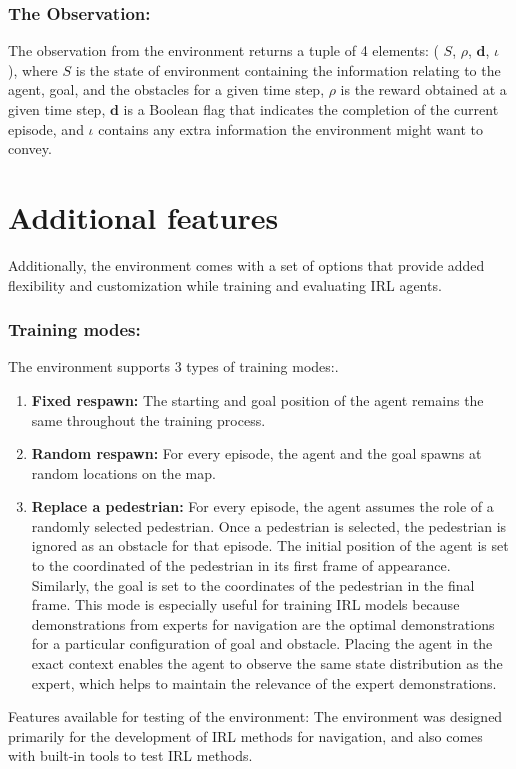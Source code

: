 \subsubsection{The Observation:}
The observation from the environment returns a tuple of 4 elements: ( $S$, $\rho$, $\mathbf{d}$, $\iota$ ), where
$S$ is the state of environment containing the information relating to the agent, goal, and the obstacles for a given time step,
$\rho$ is the reward obtained at a given time step, $\mathbf{d}$ is a Boolean flag that indicates the completion of the current episode, and $\iota$ contains any extra information the environment might want to convey.
\section{Additional features}
Additionally, the environment comes with a set of options that provide added flexibility and customization while training and evaluating IRL agents.
\subsubsection{Training modes:}
The environment supports 3 types of training modes:. 
\begin{enumerate}
    \item \textbf{Fixed respawn:} The starting and goal position of the agent remains the same throughout the training process.
    \item \textbf{Random respawn:} For every episode, the agent and the goal spawns at random locations on the map. 
    \item \textbf{Replace a pedestrian:} For every episode, the agent assumes the role of a randomly selected pedestrian. Once a pedestrian is selected, the pedestrian is ignored as an obstacle for that episode. The initial position of the agent is set to the coordinated of the pedestrian in its first frame of appearance. Similarly, the goal is set to the coordinates of the pedestrian in the final frame.
    This mode is especially useful for training IRL models because demonstrations from experts for navigation are the optimal demonstrations for a particular configuration of goal and obstacle. Placing the agent in the exact context enables the agent to observe the same state distribution as the expert, which helps to maintain the relevance of the expert demonstrations. 
\end{enumerate}
Features available for testing of the environment:
The environment was designed primarily for the development of IRL methods for navigation, and also comes with built-in tools to test IRL methods.
